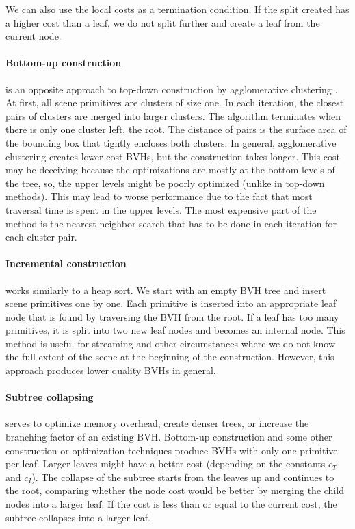 We can also use the local costs as a termination condition. If the split created has a higher cost than a leaf, we do not split further and create a leaf from the current node.

\paragraph{Bottom-up construction} is an opposite approach to top-down construction by agglomerative clustering \cite{WBKP08}. At first, all scene primitives are clusters of size one. In each iteration, the closest pairs of clusters are merged into larger clusters. The algorithm terminates when there is only one cluster left, the root. The distance of pairs is the surface area of the bounding box that tightly encloses both clusters. In general, agglomerative clustering creates lower cost BVHs, but the construction takes longer. This cost may be deceiving because the optimizations are mostly at the bottom levels of the tree, so, the upper levels might be poorly optimized (unlike in top-down methods). This may lead to worse performance due to the fact that most traversal time is spent in the upper levels. The most expensive part of the method is the nearest neighbor search that has to be done in each iteration for each cluster pair. \cite{Meister2021} 

\paragraph{Incremental construction} works similarly to a heap sort. We start with an empty BVH tree and insert scene primitives one by one. Each primitive is inserted  into an appropriate leaf node that is found by traversing the BVH from the root. If a leaf has too many primitives, it is split into two new leaf nodes and becomes an internal node. This method is useful for streaming and other circumstances where we do not know the full extent of the scene at the beginning of the construction. However, this approach produces lower quality BVHs in general. \cite{Meister2021}

\paragraph{Subtree collapsing} serves to optimize memory overhead, create denser trees, or increase the branching factor of an existing BVH. Bottom-up construction and some other construction or optimization techniques produce BVHs with only one primitive per leaf. Larger leaves might have a better cost (depending on the constants $c_T$ and $c_I$). The collapse of the subtree starts from the leaves up and continues to the root, comparing whether the node cost would be better by merging the child nodes into a larger leaf. If the cost is less than or equal to the current cost, the subtree collapses into a larger leaf. \cite{Meister2021}

